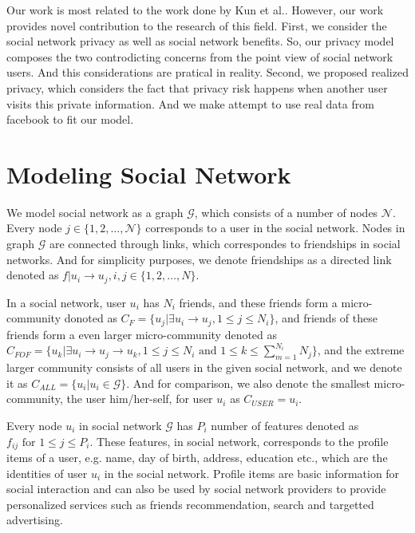 \documentclass[a4paper]{article}
\begin{document}
Our work is most related to the work done by Kun et al.. However, our
work provides novel contribution to the research of this field. First,
we consider the social network privacy as well as social network
benefits. So, our privacy model composes the two controdicting
concerns from the point view of social network users. And this
considerations are pratical in reality. Second, we proposed realized
privacy, which considers the fact that privacy risk happens when
another user visits this private information. And we make attempt to
use real data from facebook to fit our model. 

\section{Modeling Social Network}
We model social network as a graph $\mathcal{G}$, which consists of
a number of nodes $\mathcal{N}$. Every node $j\in 
\{1,2,\ldots, \mathcal{N}\}$ corresponds to a user in the social
network. Nodes in graph $\mathcal{G}$ are connected through 
links, which correspondes to friendships in social networks. And for
simplicity purposes, we denote friendships as a directed link denoted
as $f|u_i\rightarrow u_j, i,j\in \{1,2,\ldots,N\}$. 

In a social network, user $u_i$ has $N_i$ friends, and these friends
form a micro-community donoted as $C_F=\{u_j|\exists u_i\rightarrow
u_j, 1\leq j\leq N_i\}$, and friends of these friends form a even larger
micro-community denoted as $C_{FOF} = \{u_k|\exists u_i\rightarrow
u_j\rightarrow u_k, 1\leq j\leq N_i \mbox{ and } 1\leq k \leq
\sum_{m=1}^{N_i}N_j \}$, and the extreme larger community consists of
all users in the given social network, and we denote it as $C_{ALL} =
\{ u_i|u_i\in\mathcal{G} \}$. And for comparison, we also denote the
smallest micro-community, the user him/her-self, for user $u_i$ as
$C_{USER} = u_i$. 

Every node $u_i$ in social network $\mathcal{G}$ has $P_i$ number of
features denoted as $f_{ij} \mbox{ for } 1\leq j\leq P_i$. These
features, in social network, corresponds to the profile items of a
user, e.g. name, day of birth, address, education etc., which are the
identities of user $u_i$ in the social network. Profile items
are basic information for social interaction and can also be used by
social network providers to provide personalized 
services such as friends recommendation, search and targetted
advertising. 
\end{document}
